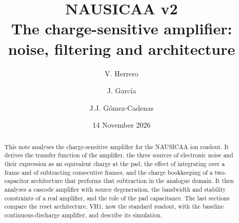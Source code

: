\documentclass[11pt,a4paper]{article}
\title{NAUSICAA v2\\[4pt]\large The charge-sensitive amplifier: noise, filtering and architecture}
\author{V. Herrero \and J. Garc\'ia \and J.J. G\'omez-Cadenas}
\date{14 November 2026}
\begin{document}
\maketitle
\begin{abstract}
This note analyses the charge-sensitive amplifier for the NAUSICAA ion
readout. It derives the transfer function of the amplifier, the three sources of
electronic noise and
their expression as an equivalent charge at the pad, the effect of integrating
over a frame and of subtracting consecutive frames, and the charge
bookkeeping of a two-capacitor architecture that performs that subtraction in
the analogue domain. It then analyses a cascode amplifier with source degeneration, the
bandwidth and stability constraints of a real amplifier, and the role of the
pad capacitance. The last sections compare the reset architecture, VH1, now
the standard readout, with the baseline continuous-discharge amplifier, and
describe its simulation.
\end{abstract}
\tableofcontents

\end{document}
